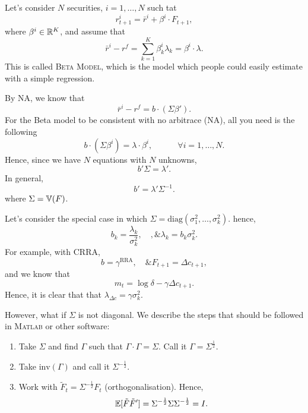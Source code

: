 Let's consider $N$ securities, $i=1,\ldots, N$ such tat
$$
	r_{t+1}^i = \bar{r}^i + \beta^i\cdot F_{t+1},
$$
where $\beta^i\in \mathbb{R}^K$, and assume that
$$
	\bar{r}^i - r^f = \sum_{k=1}^K \beta_k^i \lambda_k = \beta^i\cdot\lambda.
$$	
This is called \textsc{Beta Model}, which is the model which people could easily estimate with a simple regression.

By NA, we know that
$$
	\bar{r}^i - r^f= b\cdot(\Sigma\beta').
$$
For the Beta model to be consistent with no arbitrace (NA), all you need is the following
$$	
	b\cdot(\Sigma \beta^i) = \lambda\cdot\beta^i, \quad\qquad\forall i=1,\ldots, N.
$$
Hence, since we have $N$ equations with $N$ unknowns, 
$$
	b'\Sigma = \lambda'.
$$
In general,
$$
	b' = \lambda'\Sigma^{-1}.
$$
where $\Sigma = \mathbb{V}(F)$. 

Let's consider the special case in which $\Sigma = \text{diag}(\sigma_1^2,\ldots, \sigma_k^2)$. hence,
$$
	b_k =\frac{\lambda_k}{\sigma_k^2}, \quad, \& \lambda_k = b_k\sigma_k^2.
$$
For example, with CRRA, 
$$
	b = \gamma^\text{RRA}, \quad \& F_{t+1} = \Delta c_{t+1},
$$
and we know that 
$$
	m_t = \log \delta - \gamma\Delta c_{t+1}.
$$
Hence, it is clear that that $\lambda_{\Delta c} = \gamma \sigma_k^2$.

However, what if $\Sigma$ is not diagonal. We describe the steps that should be followed in \textsc{Matlab} or other software:
\begin{enumerate}[wide, labelindent=1cm, itemsep=0cm, topsep=0cm]
	\item Take $\Sigma $ and find $\Gamma$ such that $\Gamma\cdot\Gamma = \Sigma$. Call it $\Gamma = \Sigma^{\frac{1}{2}}$.
	\item Take $\text{inv}(\Gamma)$ and call it $\Sigma^{-\frac{1}{2}}$.
	\item Work with $\tilde{F}_t = \Sigma^{-\frac{1}{2}} F_t$ (orthogonalisation). Hence,
	$$
		\mathbb{E}[\tilde{F}\tilde{F}'] = \Sigma^{-\frac{1}{2}}\Sigma\Sigma^{-\frac{1}{2}} = I.
	$$
\end{enumerate}